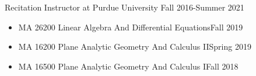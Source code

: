 \documentclass[12pt]{article}
\renewcommand{\section}[1]{\pagebreak[3]%
    \hyphenpenalty=10000%
    \vspace{1.3\baselineskip}%
    \phantomsection\addcontentsline{toc}{section}{#1}%
    \noindent\llap{\scshape\smash{\parbox[t]{\marginparwidth}{\raggedright #1}}}%
    \vspace{-\baselineskip}\par}
\newenvironment{innerlist}[1][\enskip\textbullet]%
        {\begin{itemize}[#1,leftmargin=*,parsep=0pt,itemsep=0pt,topsep=0pt,partopsep=0pt]}
        {\end{itemize}}
\begin{document}
Recitation Instructor at Purdue University
\hfill {Fall 2016-Summer 2021}
\begin{innerlist}
\item MA 26200 Linear Algebra And Differential Equations\hfill Fall 2019
\item MA 16200 Plane Analytic Geometry And Calculus II\hfill Spring 2019
\item MA 16500 Plane Analytic Geometry And Calculus I\hfill Fall 2018
\end{innerlist}


\end{document}

